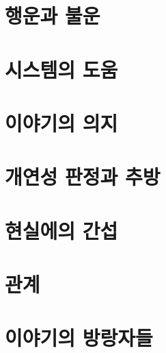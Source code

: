 \documentclass{report}
\begin{document}
	\section{행운과 불운}
		
	
	\section{시스템의 도움}
		
	
	\section{이야기의 의지}
		
	
	\section{개연성 판정과 추방}
		
	
	\section{현실에의 간섭}
		
	
	\section{관계}
		
	
	\section{이야기의 방랑자들}
		
\end{document}
